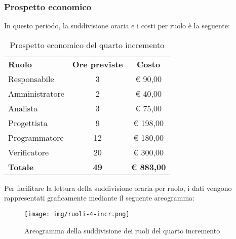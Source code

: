 \documentclass[../piano-di-progetto.tex]{subfiles}
\begin{document}
  \subsubsection{Prospetto economico}
  In questo periodo, la suddivisione oraria e i costi per ruolo è la seguente:

  \begin{table}[H]
    \centering
    \begin{tabular}{lcc}
      \rowcolor{lightgray}
      \textbf{Ruolo}  & \textbf{Ore previste} & \textbf{Costo}    \\
Responsabile    & 3                     & € 90,00           \\
Amministratore  & 2                     & € 40,00           \\
Analista        & 3                     & € 75,00           \\
Progettista     & 9                     & € 198,00          \\
Programmatore   & 12                    & € 180,00          \\
Verificatore    & 20                    & € 300,00          \\
\textbf{Totale} & \textbf{49}           & \textbf{€ 883,00}
    \end{tabular}
    \caption{Prospetto economico del quarto incremento}
  \end{table}


  Per facilitare la lettura della suddivisione oraria per ruolo, i dati vengono rappresentati graficamente mediante il seguente areogramma:
  \begin{figure}[H]
    \centering
    \texttt{[image: img/ruoli-4-incr.png]}
    \caption{Areogramma della suddivisione dei ruoli del quarto incremento}
    \label{fig:ore-ruolo-progettazione}
  \end{figure}
\end{document}
